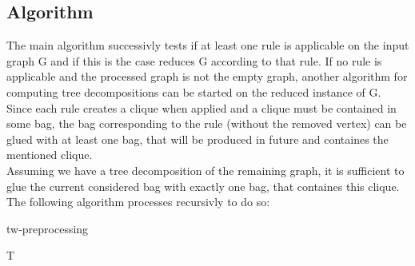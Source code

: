 \documentclass[a4wide]{article}
\begin{document}
\subsection{Algorithm}

The main algorithm successivly tests if at least one rule is applicable on the input graph G and if this is the case reduces G according to that rule. If no rule is applicable and the processed graph is not the empty graph, another algorithm for computing tree decompositions can be started on the reduced instance of G. \\
Since each rule creates a clique when applied and a clique must be contained in some bag, the bag corresponding to the rule (without the removed vertex) can be glued with at least one bag, that will be produced in future and containes the mentioned clique. \\ 
Assuming we have a tree decomposition of the remaining graph, it is sufficient to glue the current considered bag with exactly one bag, that containes this clique. The following algorithm processes recursivly to do so: \\

\newpage

\begin{algorithm}
\caption{tw-preprocessing}
\begin{algorithmic}
\State \Return T
\EndIf
\State {}
\State {}
\Return
\EndIf
{}
\EndIf
\EndProcedure
\end{algorithmic}
\end{algorithm}	

\vspace*{3mm}
\end{document}
